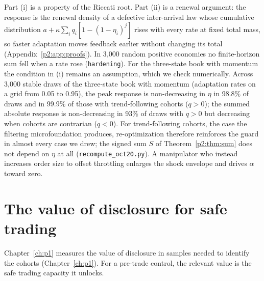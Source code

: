 Part (i) is a property of the Riccati root. Part (ii) is a renewal argument: the response is the renewal density of a defective inter-arrival law whose cumulative distribution $a+\kappa\sum_iq_i[1-(1-\eta_i)^j]$ rises with every rate at fixed total mass, so faster adaptation moves feedback earlier without changing its total (Appendix~\ref{p2:app:proofs}). In 3{,}000 random positive economies no finite-horizon sum fell when a rate rose (\texttt{hardening}). For the three-state book with momentum the condition in (i) remains an assumption, which we check numerically. Across 3{,}000 stable draws of the three-state book with momentum (adaptation rates on a grid from 0.05 to 0.95), the peak response is non-decreasing in $\eta$ in 98.8\% of draws and in 99.9\% of those with trend-following cohorts ($q>0$); the summed absolute response is non-decreasing in 93\% of draws with $q>0$ but decreasing when cohorts are contrarian ($q<0$). For trend-following cohorts, the case the filtering microfoundation produces, re-optimization therefore reinforces the guard in almost every case we drew; the signed sum $S$ of Theorem~\ref{p2:thm:sum} does not depend on $\eta$ at all (\texttt{recompute\_oct20.py}). A manipulator who instead increases order size to offset throttling enlarges the shock envelope and drives $\alpha$ toward zero.
\section{The value of disclosure for safe trading}\label{p2:sec:disclosure}

Chapter~\ref{ch:p1} measures the value of disclosure in samples needed to identify the cohorts (Chapter~\ref{ch:p1}). For a pre-trade control, the relevant value is the safe trading capacity it unlocks.

